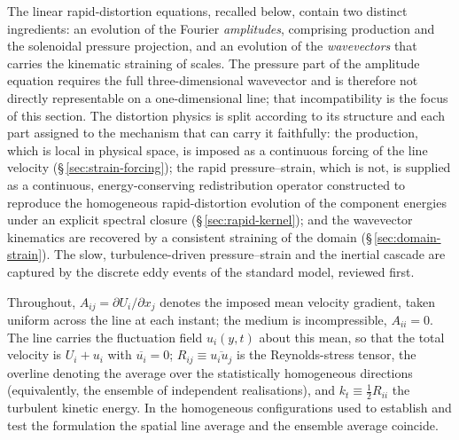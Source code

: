 \documentclass[lineno]{JFM-FLM_Au}
\begin{document}
The linear rapid-distortion equations, recalled below, contain two
distinct ingredients: an evolution of the Fourier \emph{amplitudes},
comprising production and the solenoidal pressure projection, and an
evolution of the \emph{wavevectors} that carries the kinematic straining
of scales. The pressure part of the amplitude equation requires the full
three-dimensional wavevector and is therefore not directly representable
on a one-dimensional line; that incompatibility is the focus of this section.
The distortion physics is split according to its structure and each part
assigned to the mechanism that can carry it faithfully: the production,
which is local in physical space, is imposed as a continuous forcing of
the line velocity (\S\,\ref{sec:strain-forcing}); the rapid
pressure--strain, which is not, is supplied as a continuous,
energy-conserving redistribution operator constructed to reproduce the
homogeneous rapid-distortion evolution of the component energies under an
explicit spectral closure (\S\,\ref{sec:rapid-kernel}); and the wavevector
kinematics are recovered by a consistent straining of the domain
(\S\,\ref{sec:domain-strain}). The slow, turbulence-driven pressure--strain and the inertial cascade
are captured by the discrete eddy events of the standard model, reviewed first.

Throughout, $A_{ij}=\partial U_i/\partial x_j$ denotes the imposed mean
velocity gradient, taken uniform across the line at each instant; the
medium is incompressible, $A_{ii}=0$. The line carries the fluctuation
field $u_i(y,t)$ about this mean, so that the total velocity is
$U_i+u_i$ with $\overline{u_i}=0$; $R_{ij}\equiv\overline{u_iu_j}$ is the
Reynolds-stress tensor, the overline denoting the average over the
statistically homogeneous directions (equivalently, the ensemble of
independent realisations), and $k_t\equiv\tfrac12R_{ii}$ the turbulent
kinetic energy. In the homogeneous configurations used to establish and
test the formulation the spatial line average and the ensemble average
coincide.
\end{document}
